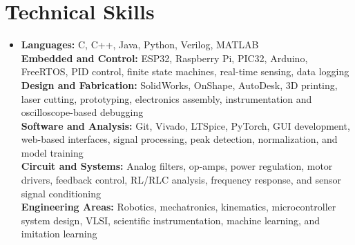 \documentclass[letterpaper,10.5pt]{article}
\makeatletter
\newcommand{\resumeItem}[1]{
  \item\small{
    {#1 
    }
  }
}
\newcommand{\resumeSubheading}[4]{  
  \vspace{-2pt}\item  
    \begin{tabular*}{1.0\textwidth}[t]{l@{\extracolsep{\fill}}r}  
      \textbf{#1} & \textbf{\small #2} \\
      \ifthenelse{\equal{#3}{}}{}{%
        \textit{\small#3} &   
        \ifthenelse{\equal{#4}{}}{}{\textit{\small #4}} \\   
      }  
    \end{tabular*}%
    \ifthenelse{\equal{#3}{} \AND \equal{#4}{}}{\vspace{-7mm}}{%
      \vspace{-8pt} %
    }  
}
\newcommand{\resumeSubHeadingListStart}{\begin{itemize}[leftmargin=0.0in, label={}]}
\newcommand{\resumeItemListStart}{\begin{itemize}}
\newcommand{\resumeItemListEnd}{\end{itemize}}
\makeatother
\begin{document}
\section{Technical Skills}
\begin{itemize}[leftmargin=0.15in, label={}]
  \item{
  \textbf{Languages:}{ C, C++, Java, Python, Verilog, MATLAB} \\
        
  \textbf{Embedded and Control:}{ ESP32, Raspberry Pi, PIC32, Arduino, FreeRTOS, PID control, finite state machines, real-time sensing, data logging} \\

  \textbf{Design and Fabrication:}{ SolidWorks, OnShape, AutoDesk, 3D printing, laser cutting, prototyping, electronics assembly, instrumentation and oscilloscope-based debugging} \\
        
  \textbf{Software and Analysis:}{ Git, Vivado, LTSpice, PyTorch, GUI development, web-based interfaces, signal processing, peak detection, normalization, and model training} \\
        
  \textbf{Circuit and Systems:}{ Analog filters, op-amps, power regulation, motor drivers, feedback control, RL/RLC analysis, frequency response, and sensor signal conditioning} \\
        
  \textbf{Engineering Areas:}{ Robotics, mechatronics, kinematics, microcontroller system design, VLSI, scientific instrumentation, machine learning, and imitation learning} \\

     }
\end{itemize}



\end{document}
